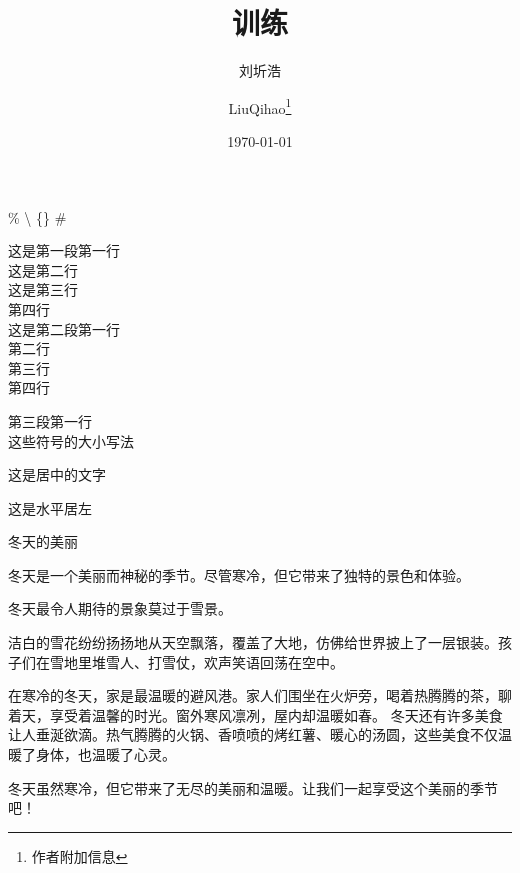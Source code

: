 \documentclass{article} %
\title{训练} %
\author{刘圻浩 \and LiuQihao\thanks{作者附加信息}} %
\date{\today} %
\begin{document}
\maketitle %

\% %
\textbackslash %
\{\} %
\# %

这是第一段第一行\\
这是第二行\\
这是第三行\\
第四行\\

这是第二段第一行\\ %
第二行\\
第三行\\
第四行\par %
第三段第一行\\
这些符号的大小\hspace{1em}写法\\ %
\begin{center} %
    这是居中的文字
\end{center}
\begin{flushleft}
    这是水平居左
\end{flushleft}\par
\begin{center}
冬天的美丽   
\end{center}\par
冬天是一个美丽而神秘的季节。尽管寒冷，但它带来了独特的景色和体验。
\begin{flushright}
冬天最令人期待的景象莫过于雪景。
\end{flushright}\par
洁白的雪花纷纷扬扬地从天空飘落，覆盖了大地，仿佛给世界披上了一层银装。孩子们在雪地里堆雪人、打雪仗，欢声笑语回荡在空中。\par
在寒冷的冬天，家是最温暖的避风港。家人们围坐在火炉旁，喝着热腾腾的茶，聊着天，享受着温馨的时光。窗外寒风凛冽，屋内却温暖如春。
冬天还有许多美食让人垂涎欲滴。热气腾腾的火锅、香喷喷的烤红薯、暖心的汤圆，这些美食不仅温暖了身体，也温暖了心灵。\par
冬天虽然寒冷，但它带来了无尽的美丽和温暖。让我们一起享受这个美丽的季节吧！
\end{document}
